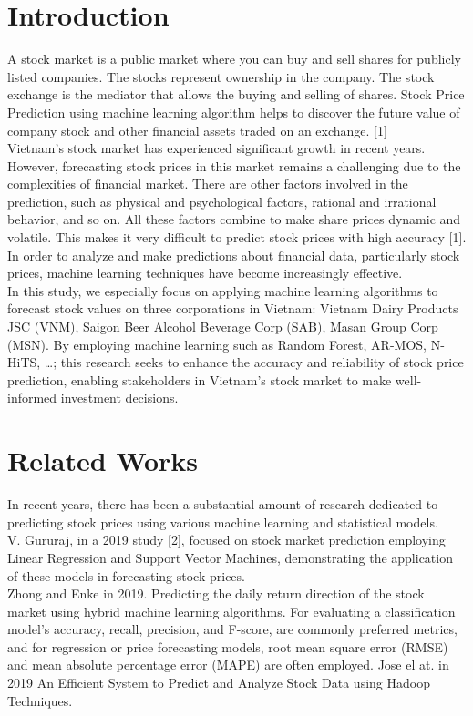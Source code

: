 \documentclass{ieeeojies}
\begin{document}
\section{Introduction}
\label{sec:introduction}
 A stock market is a public market where you can buy and sell shares for publicly listed companies. The stocks represent ownership in the company. The stock exchange is the mediator that allows the buying and selling of shares. Stock Price Prediction using machine learning algorithm helps to discover the future value of company stock and other financial assets traded on an exchange. [1]\\
Vietnam’s stock market has experienced significant growth in recent years. However, forecasting stock prices in this market remains a challenging due to the complexities of financial market. There are other factors involved in the prediction, such as physical and psychological factors, rational and irrational behavior, and so on. All these factors combine to make share prices dynamic and volatile. This makes it very difficult to predict stock prices with high accuracy [1]. In order to analyze and make predictions about financial data, particularly stock prices, machine learning techniques have become increasingly effective. \\
In this study, we especially focus on applying machine learning algorithms to forecast stock values on three corporations in Vietnam: Vietnam Dairy Products JSC (VNM), Saigon Beer Alcohol Beverage Corp (SAB), Masan Group Corp (MSN). By employing machine learning such as Random Forest, AR-MOS, N-HiTS, …; this research seeks to enhance the accuracy and reliability of stock price prediction, enabling stakeholders in Vietnam's stock market to make well-informed investment decisions.\\

\section{Related Works}
In recent years, there has been a substantial amount of research dedicated to predicting stock prices using various machine learning and statistical models.\\
V. Gururaj, in a 2019 study [2], focused on stock market prediction employing Linear Regression and Support Vector Machines, demonstrating the application of these models in forecasting stock prices.\\
Zhong and Enke in 2019. Predicting the daily return direction of the stock market using hybrid machine learning algorithms. For evaluating a classification model’s accuracy, recall, precision, and F-score, are commonly preferred metrics, and for regression or price forecasting models, root mean square error (RMSE) and mean absolute percentage error (MAPE) are often employed. Jose el at. in 2019 An Efficient System to Predict and Analyze Stock Data using Hadoop Techniques.\\
\end{document}
